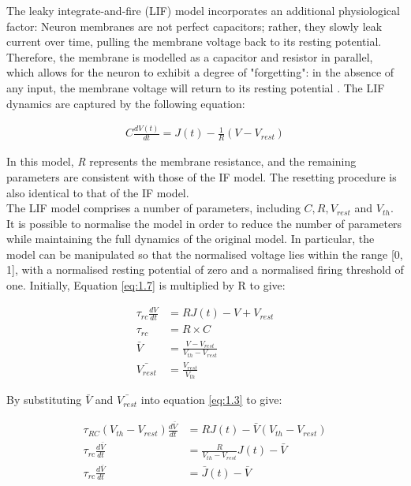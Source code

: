 \noindent The leaky integrate-and-fire (LIF) model \cite{knight1972dynamics} incorporates an additional physiological factor: Neuron membranes are not perfect capacitors; rather, they slowly leak current over time, pulling the membrane voltage back to its resting potential. Therefore, the membrane is modelled as a capacitor and resistor in parallel, which allows for the neuron to exhibit a degree of "forgetting": in the absence of any input, the membrane voltage will return to its resting potential \cite{koch2004biophysics}. The LIF dynamics are captured by the following equation:

\begin{align}
C \frac{dV(t)}{dt} = J(t) - \frac{1}{R} (V - V_{rest}) \label{eq:1.7} 
\end{align}

\noindent In this model, \textit{R} represents the membrane resistance, and the remaining parameters are consistent with those of the IF model. The resetting procedure is also identical to that of the IF model.\\

\noindent The LIF model comprises a number of parameters, including $C, R, V_{rest}$ and $V_{th}$. It is possible to normalise the model in order to reduce the number of parameters while maintaining the full dynamics of the original model. In particular, the model can be manipulated so that the normalised voltage lies within the range [0, 1], with a normalised resting potential of zero and a normalised firing threshold of one. Initially, Equation \ref{eq:1.7} is multiplied by R to give:

\begin{align}
    \tau_{rc} \frac{dV}{dt} &= RJ(t) - V + V_{rest} \label{eq:1.8} \\
    \tau_{rc} &= R \times C \label{eq:1.9} \\
    \bar{V} &= \frac{V - V_{rest}}{V_{th} - V_{rest}} \label{eq:1.10} \\
    \bar{V_{rest}} &= \frac{V_{rest}}{V_{th}} \label{eq:1.11} 
\end{align}

\noindent By substituting $\bar{V}$ and $\bar{V_{rest}}$ into equation \ref{eq:1.3} to give:


\begin{align}
    \tau_{RC}(V_{th} - V_{rest})\frac{d\bar{V}}{dt} &= RJ(t) - \bar{V}(V_{th} - V_{rest})
    \label{eq:1.12} \\
    \tau_{rc}\frac{d\bar{V}}{dt} &= \frac{R}{V_{th} - V_{rest}} J(t) - \bar{V} \label{eq:1.13} \\
    \tau_{rc} \frac{d\bar{V}}{dt} &= \bar{J}(t) - \bar{V} \label{eq:1.14} 
\end{align}

